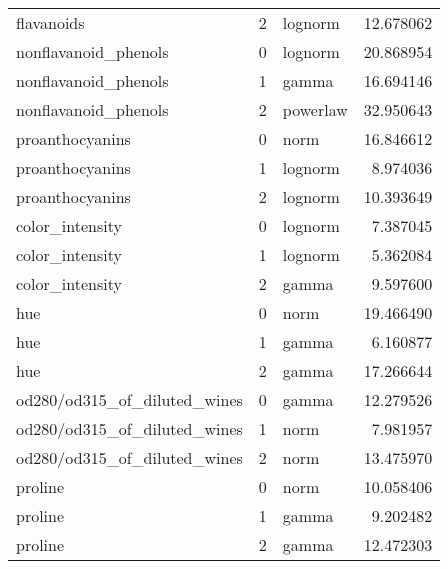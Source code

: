 \begin{tabular}{lrlr}
                  flavanoids &           2 &      lognorm &        12.678062 \\
        nonflavanoid\_phenols &           0 &      lognorm &        20.868954 \\
        nonflavanoid\_phenols &           1 &        gamma &        16.694146 \\
        nonflavanoid\_phenols &           2 &     powerlaw &        32.950643 \\
             proanthocyanins &           0 &         norm &        16.846612 \\
             proanthocyanins &           1 &      lognorm &         8.974036 \\
             proanthocyanins &           2 &      lognorm &        10.393649 \\
             color\_intensity &           0 &      lognorm &         7.387045 \\
             color\_intensity &           1 &      lognorm &         5.362084 \\
             color\_intensity &           2 &        gamma &         9.597600 \\
                         hue &           0 &         norm &        19.466490 \\
                         hue &           1 &        gamma &         6.160877 \\
                         hue &           2 &        gamma &        17.266644 \\
od280/od315\_of\_diluted\_wines &           0 &        gamma &        12.279526 \\
od280/od315\_of\_diluted\_wines &           1 &         norm &         7.981957 \\
od280/od315\_of\_diluted\_wines &           2 &         norm &        13.475970 \\
                     proline &           0 &         norm &        10.058406 \\
                     proline &           1 &        gamma &         9.202482 \\
                     proline &           2 &        gamma &        12.472303 \\
\bottomrule
\end{tabular}
